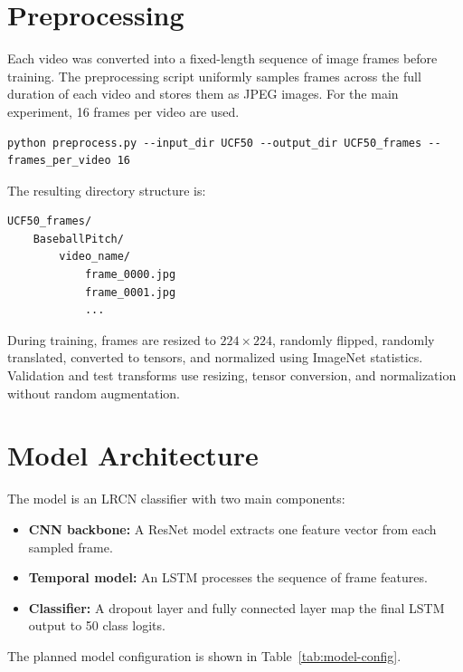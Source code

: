 \documentclass[11pt]{article}
\begin{document}
\section{Preprocessing}

Each video was converted into a fixed-length sequence of image frames before training.
The preprocessing script uniformly samples frames across the full duration of each video and stores them as JPEG images.
For the main experiment, 16 frames per video are used.

\begin{verbatim}
python preprocess.py --input_dir UCF50 --output_dir UCF50_frames --frames_per_video 16
\end{verbatim}

\noindent
The resulting directory structure is:

\begin{verbatim}
UCF50_frames/
    BaseballPitch/
        video_name/
            frame_0000.jpg
            frame_0001.jpg
            ...
\end{verbatim}

During training, frames are resized to $224 \times 224$, randomly flipped, randomly translated, converted to tensors, and normalized using ImageNet statistics.
Validation and test transforms use resizing, tensor conversion, and normalization without random augmentation.

\section{Model Architecture}

The model is an LRCN classifier with two main components:

\begin{itemize}
    \item \textbf{CNN backbone:} A ResNet model extracts one feature vector from each sampled frame.
    \item \textbf{Temporal model:} An LSTM processes the sequence of frame features.
    \item \textbf{Classifier:} A dropout layer and fully connected layer map the final LSTM output to 50 class logits.
\end{itemize}

\noindent
The planned model configuration is shown in Table~\ref{tab:model-config}.
\end{document}

